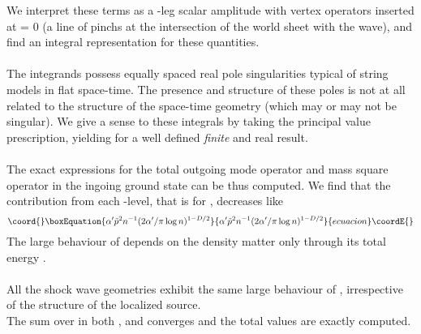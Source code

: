 \documentclass[12pt,a4paper]{article}
\begin{document}
We interpret these terms as a \coordHE{}-leg scalar amplitude with vertex operators 
inserted at \myHighlight{$\tau $}\coordHE{} = 0 (a line of pinchs at the intersection of the world 
sheet with the wave), and find an integral representation for these 
quantities. \\ \\
The integrands possess equally spaced real pole singularities typical of 
string models in flat space-time. The presence and structure of these 
poles is not at all related to the structure of the space-time geometry 
(which may or may not be singular). We give a sense to these integrals by 
taking the principal value prescription, yielding for 
\coordHE{} a well defined {\it finite} and real 
result. \\ \\
The exact expressions for the total outgoing mode operator \coordHE{} and mass square \coordHE{} operator in the ingoing 
ground state \coordHE{} can be thus computed. We find that the 
contribution from each \coordHE{}-level, that is \coordHE{} for \coordHE{}, decreases like 
\begin{equation}\coord{}\boxEquation{
\alpha ' \tilde p^2 n^{-1} (2\alpha ' / \pi \log n)^{1-D/2}
}{
\alpha ' \tilde p^2 n^{-1} (2\alpha ' / \pi \log n)^{1-D/2}
}{ecuacion}\coordE{}\end{equation}
The large \coordHE{} behaviour of \coordHE{} depends on the density 
matter \myHighlight{$\tilde{\rho } $}\coordHE{} only through its total energy 
\coordHE{}. \\ \\
All the shock wave geometries exhibit the same large \coordHE{} behaviour of 
\coordHE{}, irrespective of the structure of the localized source. \\
The sum over \coordHE{} in both \coordHE{}, and 
\coordHE{} converges and the total values are exactly computed. \\ \\
\end{document}
